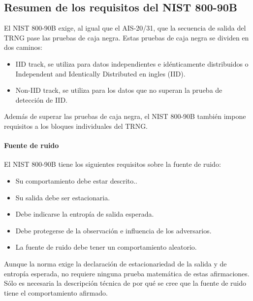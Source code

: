         \subsection{Resumen de los requisitos del NIST 800-90B}
	
            El NIST 800-90B exige, al igual que el AIS-20/31, que la secuencia de salida del TRNG pase las pruebas de caja negra. Estas pruebas de caja negra se dividen en dos caminos:
            
            \begin{itemize}[noitemsep]
                \item IID track, se utiliza para datos independientes e idénticamente distribuidos o Independent and Identically Distributed en ingles (IID).
                \item Non-IID track, se utiliza para los datos que no superan la prueba de detección de IID.
            \end{itemize}

            Además de superar las pruebas de caja negra, el NIST 800-90B también impone requisitos a los bloques individuales del TRNG.
            
            \paragraph{Fuente de ruido\\}
            
                El NIST 800-90B tiene los siguientes requisitos sobre la fuente de ruido:
                
            \begin{itemize}[noitemsep]
                \item Su comportamiento debe estar descrito..
                \item Su salida debe ser estacionaria.
                \item Debe indicarse la entropía de salida esperada.
                \item Debe protegerse de la observación e influencia de los adversarios.
                \item La fuente de ruido debe tener un comportamiento aleatorio.
            \end{itemize}
            
            Aunque la norma exige la declaración de estacionariedad de la salida y de entropía esperada, no requiere ninguna prueba matemática de estas afirmaciones. Sólo es necesaria la descripción técnica de por qué se cree que la fuente de ruido tiene el comportamiento afirmado.
            

